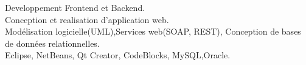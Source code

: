 
{}
\divider


Developpement Frontend et Backend.\\
Conception et realisation d'application web.\\
Modélisation logicielle(UML),Services web(SOAP, REST), Conception de bases de données relationnelles.\\
\divider
{}
Eclipse, NetBeans, Qt Creator, CodeBlocks, MySQL,Oracle.\\
\divider
\begin{quote}

\end{quote}











